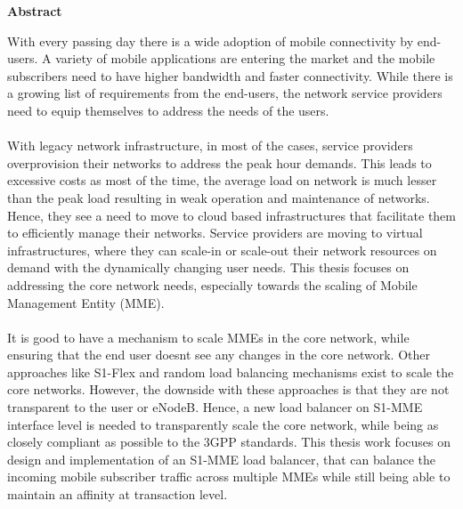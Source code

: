 \thispagestyle{empty}
\vspace*{1.0cm}

\begin{center}
    \textbf{Abstract}
\end{center}

\vspace*{0.5cm}

\noindent
With every passing day there is a wide adoption of mobile connectivity by end-users. A variety of mobile applications are entering the market and the mobile subscribers need to have higher bandwidth and faster connectivity. While there is a growing list of requirements from the end-users, the network service providers need to equip themselves to address the needs of the users.\\\\

\noindent
With legacy network infrastructure, in most of the cases, service providers overprovision their networks to address the peak hour demands. This leads to excessive costs as most of the time, the average load on network is much lesser than the peak load resulting in weak operation and maintenance of networks. Hence, they see a need to move to cloud based infrastructures that facilitate them to efficiently manage their networks. Service providers are moving to virtual infrastructures, where they can scale-in or scale-out their network resources on demand with the dynamically changing user needs. This thesis focuses on addressing the core network needs, especially towards the scaling of Mobile Management Entity (MME).\\\\

\noindent
It is good to have a mechanism to scale MMEs in the core network,  while ensuring that the end user doesn\textsc{}t see any changes in the core network. Other approaches like S1-Flex and random load balancing mechanisms exist to scale the core networks. However, the downside with these approaches is that they are not transparent to the user or eNodeB. Hence, a new load balancer on S1-MME interface level is needed to transparently scale the core network, while being as closely compliant as possible to the 3GPP standards. This thesis work focuses on design and implementation of an S1-MME load balancer, that can balance the incoming mobile subscriber traffic across multiple MMEs while still being able to maintain an affinity at transaction level.\\\\


